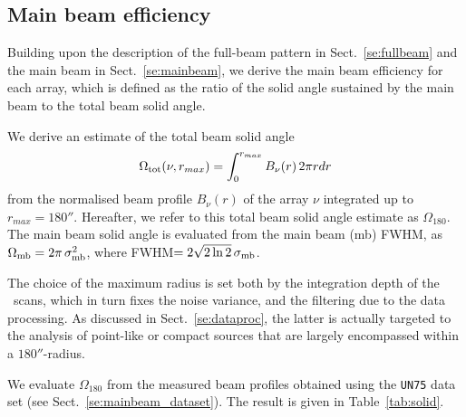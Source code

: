 \subsection{Main beam efficiency}
\label{se:beam_efficiency}

Building upon the description of the full-beam pattern in
Sect.~\ref{se:fullbeam} and the main beam in Sect.~\ref{se:mainbeam},
we derive the main beam efficiency for each array, which is defined as the
ratio of the solid angle sustained by the main beam to the total beam
solid angle.

We derive an estimate of the total beam solid angle
\begin{equation}
  \Omega_{\rm{tot}} (\nu, r_{max}) = \int_0^{r_{max}} B_{\nu}(r) \,  2 \pi r dr
  \label{eq:omega_tot}
\end{equation}
from the normalised beam profile $B_\nu(r)$ of the array
$\nu$ integrated up to $r_{max} = 180''$. {\lp Hereafter, we refer to
this total beam solid angle estimate as $\Omega_{180}$.}
The main beam solid angle is
evaluated from the main beam (mb) FWHM, as
$\Omega_{\rm{mb}} = 2 \pi\,  \sigma_{\rm{mb}}^2$, where FWHM$ =
2\sqrt{2\ln{2}}\, \sigma_{\rm{mb}}$. 

The choice of the maximum radius is set both by the integration depth of
the \bm\ scans, which in turn fixes the noise variance, and the
filtering due to the data processing. {\lp As discussed in
Sect.~\ref{se:dataproc}, the latter is actually targeted to the analysis of
point-like or compact sources that are largely encompassed
within a $180''$-radius.}

We evaluate {\lp $\Omega_{180}$} from the measured beam profiles
obtained using the {\tt UN75} data set (see Sect.~\ref{se:mainbeam_dataset}).
The result is given in Table~\ref{tab:solid}.

